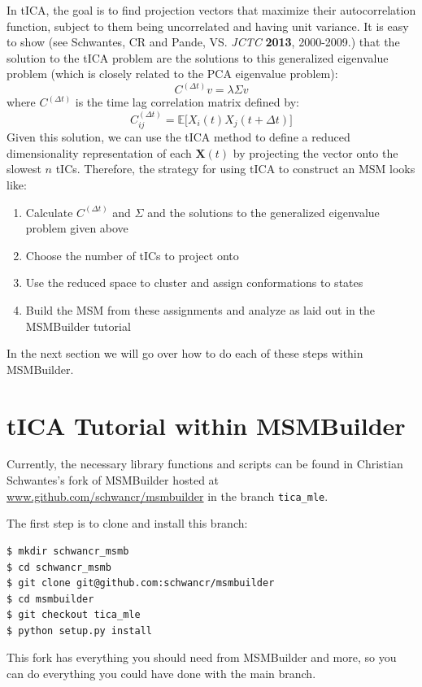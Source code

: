 \documentclass[12pt]{article}
\begin{document}
In tICA, the goal is to find projection vectors that maximize their autocorrelation function, subject to them being uncorrelated and having unit variance. It is easy to show (see Schwantes, CR and Pande, VS. {\it JCTC} {\bf 2013}, 2000-2009.) that the solution to the tICA problem are the solutions to this generalized eigenvalue problem (which is closely related to the PCA eigenvalue problem):
$$ C^{(\Delta t)} v = \lambda \Sigma v $$ where $C^{(\Delta t)}$ is the time lag correlation matrix defined by:
$$ C^{(\Delta t)}_{ij} = \mathbb{E}\Big[ X_i(t) X_j(t+\Delta t) \Big] $$ Given this solution, we can use the tICA method to define a reduced dimensionality representation of each $\mathbf{X}(t)$ by projecting the vector onto the slowest $n$ tICs. Therefore, the strategy for using tICA to construct an MSM looks like:

\begin{enumerate}
\item Calculate $C^{(\Delta t)}$ and $\Sigma$ and the solutions to the generalized eigenvalue problem given above
\item Choose the number of tICs to project onto
\item Use the reduced space to cluster and assign conformations to states
\item Build the MSM from these assignments and analyze as laid out in the MSMBuilder tutorial
\end{enumerate}

In the next section we will go over how to do each of these steps within MSMBuilder.

\section{tICA Tutorial within MSMBuilder}

Currently, the necessary library functions and scripts can be found in Christian Schwantes's fork of MSMBuilder hosted at \url{www.github.com/schwancr/msmbuilder} in the branch \texttt{tica\_mle}. 

The first step is to clone and install this branch:

\begin{verbatim}
$ mkdir schwancr_msmb
$ cd schwancr_msmb
$ git clone git@github.com:schwancr/msmbuilder
$ cd msmbuilder
$ git checkout tica_mle
$ python setup.py install
\end{verbatim}

This fork has everything you should need from MSMBuilder and more, so you can do everything you could have done with the main branch.
\end{document}
